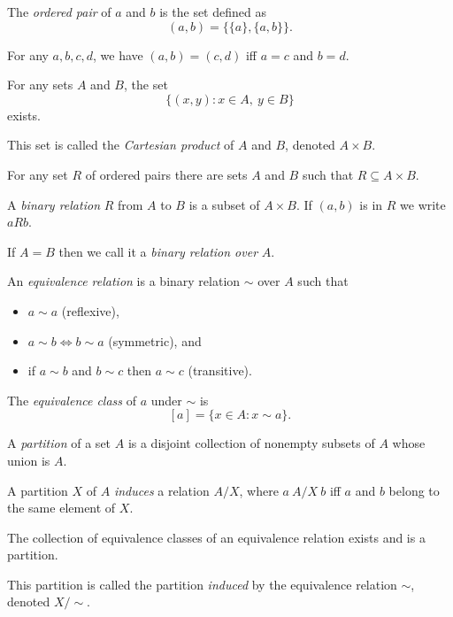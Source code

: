 \begin{defn}
  The \emph{ordered pair} of $a$ and $b$ is the set defined as
  \[(a,b)=\{\{a\},\{a,b\}\}.\]
\end{defn}
\begin{prop}
  For any $a,b,c,d$, we have $(a,b)=(c,d)$ iff $a=c$ and $b=d$.
\end{prop}
\begin{prop}
  For any sets $A$ and $B$, the set
  \[\{(x,y): x\in A,\ y\in B\}\]
  exists.
\end{prop}
\begin{defn}
  This set is called the \emph{Cartesian product} of $A$ and $B$, denoted
  $A\times B$.
\end{defn}
\begin{prop}
  For any set $R$ of ordered pairs there are sets $A$ and $B$ such that
  $R\subseteq A\times B$.
\end{prop}
\begin{defn}
  A \emph{binary relation} $R$ from $A$ to $B$ is a subset of $A\times
  B$. If $(a,b)$ is in $R$ we write $aRb$.

  If $A=B$ then we call it a \emph{binary relation over} $A$.
\end{defn}
\begin{defn}
  An \emph{equivalence relation} is a binary relation $\sim$ over $A$ such
  that
  \begin{itemize}
    \item $a\sim a$ (reflexive),
    \item $a\sim b\iff b\sim a$ (symmetric), and
    \item if $a\sim b$ and $b\sim c$ then $a\sim c$ (transitive).
  \end{itemize}
  The \emph{equivalence class} of $a$ under $\sim$ is
  \[[a]=\{x\in A:x\sim a\}.\]
\end{defn}
\begin{defn}
  A \emph{partition} of a set $A$ is a disjoint collection of nonempty subsets
  of $A$ whose union is $A$.

  A partition $X$ of $A$ \emph{induces} a relation $A/X$, where $a\ A/X\ b$ iff
  $a$ and $b$ belong to the same element of $X$.
\end{defn}
\begin{prop}
  The collection of equivalence classes of an equivalence relation exists and 
  is a partition.
\end{prop}
\begin{defn}
  This partition is called the partition \emph{induced} by the equivalence
  relation $\sim$, denoted $X/\sim$.
\end{defn}
